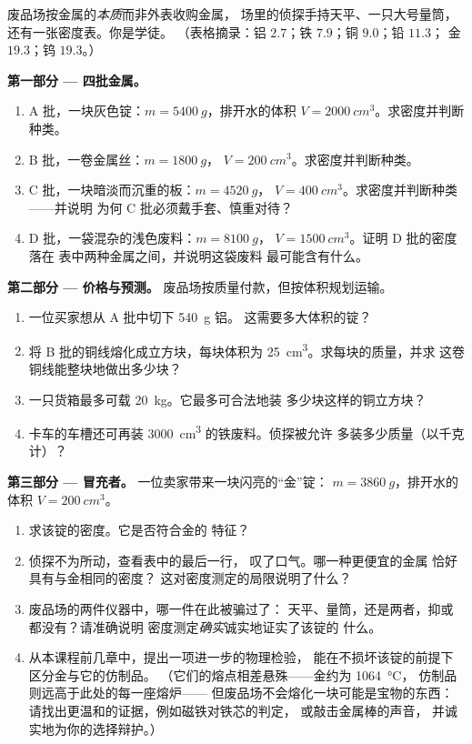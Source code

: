 \begin{problem}\label{pb:g7:volume-mass-density:1}
废品场按金属的\emph{本质}而非外表收购金属，
场里的侦探手持天平、一只大号量筒，
还有一张密度表。你是学徒。
（表格摘录：铝 $2.7$；铁 $7.9$；铜 $9.0$；铅 $11.3$；
金 $19.3$；钨 $19.3$。）

\medskip\noindent\textbf{第一部分 --- 四批金属。}
\begin{enumerate}
  \item A 批，一块灰色锭：$m = \qty{5400}{g}$，排开水的体积
        $V = \qty{2000}{cm^3}$。求密度并判断种类。
  \item B 批，一卷金属丝：$m = \qty{1800}{g}$，
        $V = \qty{200}{cm^3}$。求密度并判断种类。
  \item C 批，一块暗淡而沉重的板：$m = \qty{4520}{g}$，
        $V = \qty{400}{cm^3}$。求密度并判断种类——并说明
        为何 C 批必须戴手套、慎重对待？
  \item D 批，一袋混杂的浅色废料：$m = \qty{8100}{g}$，
        $V = \qty{1500}{cm^3}$。证明 D 批的密度落在
        表中两种金属之间，并说明这袋废料
        最可能含有什么。
\end{enumerate}

\medskip\noindent\textbf{第二部分 --- 价格与预测。}
废品场按质量付款，但按体积规划运输。
\begin{enumerate}[resume]
  \item 一位买家想从 A 批中切下 \qty{540}{g} 铝。
        这需要多大体积的锭？
  \item 将 B 批的铜线熔化成立方块，每块体积为
        \qty{25}{cm^3}。求每块的质量，并求
        这卷铜线能整块地做出多少块？
  \item 一只货箱最多可载 \qty{20}{kg}。它最多可合法地装
        多少块这样的铜立方块？
  \item 卡车的车槽还可再装 \qty{3000}{cm^3}
        的铁废料。侦探被允许
        多装多少质量（以千克计）？
\end{enumerate}

\medskip\noindent\textbf{第三部分 --- 冒充者。}
一位卖家带来一块闪亮的“金”锭：
$m = \qty{3860}{g}$，排开水的体积 $V = \qty{200}{cm^3}$。
\begin{enumerate}[resume]
  \item 求该锭的密度。它是否符合金的
        特征？
  \item 侦探不为所动，查看表中的最后一行，
        叹了口气。哪一种更便宜的金属
        恰好具有与金相同的密度？
        这对密度测定的局限说明了什么？
  \item 废品场的两件仪器中，哪一件在此被骗过了：
        天平、量筒，还是两者，抑或都没有？请准确说明
        密度测定\emph{确实}诚实地证实了该锭的
        什么。
  \item 从本课程前几章中，提出一项进一步的物理检验，
        能在不损坏该锭的前提下区分金与它的仿制品。
        （它们的熔点相差悬殊——金约为 \qty{1064}{\celsius}，
        仿制品则远高于此处的每一座熔炉——
        但废品场不会熔化一块可能是宝物的东西：
        请找出更温和的证据，例如磁铁对铁芯的判定，
        或敲击金属棒的声音，
        并诚实地为你的选择辩护。）
\end{enumerate}


\end{problem}
